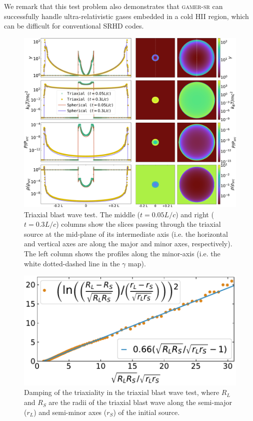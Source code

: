 \documentclass[twocolumn]{aastex63}
\begin{document}
We remark that this test problem also demonstrates that \textsc{gamer-sr} can successfully handle ultra-relativistic gases embedded in a cold HII region, which can be difficult for conventional SRHD codes.

\begin{figure}
\includegraphics[width=\linewidth]{ProfileSliceLowRes.png}
\centering
\caption{Triaxial blast wave test. The middle ($t=0.05L/c$) and right ($t=0.3L/c$) columns show the slices passing through the triaxial source at the mid-plane of its intermediate axis (i.e. the horizontal and vertical axes are along the major and minor axes, respectively). The left column shows the profiles along the minor-axis (i.e. the white dotted-dashed line in the $\gamma$ map).}
\label{fig:Ellipsoid blast wave}
\end{figure}

\begin{figure}
\includegraphics[width=\linewidth]{fig__AxesRatio.pdf}
\caption{Damping of the triaxiality in the triaxial blast wave test, where $R_{L}$ and $R_{S}$ are the radii of the triaxial blast wave along the semi-major ($r_{L}$) and semi-minor axes ($r_{S}$) of the initial source.}
\label{fig:BlastFitting}
\end{figure}
\end{document}
